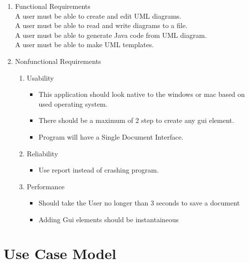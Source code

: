 \documentclass[a4paper, 12pt]{article}
\begin{document}
\begin{enumerate}
\item{Functional Requirements}\\
  A user must be able to create and edit UML diagrams.\\
  A user must be able to read and write diagrams to a file.\\
  A user must be able to generate Java code from UML diagram.\\
  A user must be able to make UML templates.\\

\item{Nonfunctional Requirements}
  \begin{enumerate}
  \item{Usability}
    \begin {itemize}
      \item This application should look native to the windows or mac based on used operating system.
      \item There should be a maximum of 2 step to create any gui element. 
      \item Program will have a Single Document Interface.
    \end {itemize}

  \item{Reliability}
    \begin {itemize}
      \item Use report instead of crashing program.
    \end {itemize}

  \item{Performance}
    \begin{itemize}
      \item Should take the User no longer than 3 seconds to save a document
      \item Adding Gui elements should be instantaineous %
    \end{itemize}
  \end{enumerate}
\end{enumerate}


\section{Use Case Model}
\end{document}
